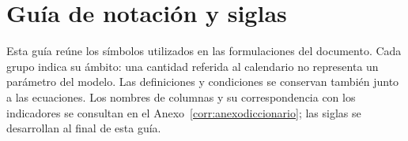 \chapter*{Guía de notación y siglas}
\label{editorial:notacion}
Esta guía reúne los símbolos utilizados en las formulaciones del documento. Cada grupo indica su ámbito: una cantidad referida al calendario no representa un parámetro del modelo. Las definiciones y condiciones se conservan también junto a las ecuaciones. Los nombres de columnas y su correspondencia con los indicadores se consultan en el Anexo~\ref{corr:anexodiccionario}; las siglas se desarrollan al final de esta guía.


